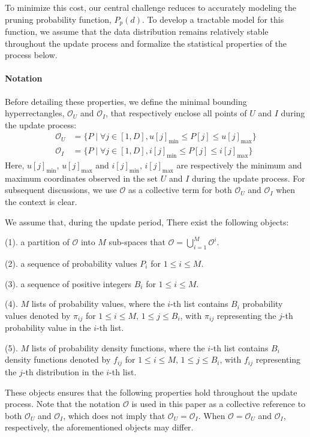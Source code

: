 To minimize this cost, our central challenge reduces to accurately modeling the pruning probability function, $P_p(d)$. To develop a tractable model for this function, we assume that the data distribution remains relatively stable throughout the update process and formalize the statistical properties of the process below.

\paragraph{Notation}
Before detailing these properties, we define the minimal bounding hyperrectangles, $\mathcal{O}_U$ and $\mathcal{O}_I$, that respectively enclose all points of $U$ and $I$ during the update process:
\begin{align}
    \mathcal{O}_U &= \{P \mid \forall j\in[1,D], u[j]_{\min} \le P[j] \le u[j]_{\max}\} \\
    \mathcal{O}_I &= \{P \mid \forall j\in[1,D], i[j]_{\min} \le P[j] \le i[j]_{\max}\}
\end{align}
Here, $u[j]_{\min}$, $u[j]_{\max}$ and $i[j]_{\min}$, $i[j]_{\max}$ are respectively the minimum and maximum coordinates observed in the set $U$ and $I$ during the update process. For subsequent discussions, we use $\mathcal{O}$ as a collective term for both $\mathcal{O}_U$ and $\mathcal{O}_I$ when the context is clear.

We assume that, during the update period, There exist the following objects:

\noindent (1). a partition of $\mathcal{O}$ into $M$ sub-spaces that $\mathcal{O} = \bigcup_{i=1}^{M}\mathcal{O}^i$.

\noindent (2). a sequence of probability values $P_i$ for $1 \leq i \leq M$.

\noindent (3). a sequence of positive integers $B_i$ for $1 \leq i \leq M$.

\noindent (4). $M$ lists of probability values, where the $i$-th list contains $B_i$ probability values denoted by $\pi_{ij}$ for $1 \leq i \leq M,\, 1 \leq j \leq B_i$, with $\pi_{ij}$ representing the $j$-th probability value in the $i$-th list.

\noindent (5). $M$ lists of probability density functions, where the $i$-th list contains $B_i$ density functions denoted by $f_{ij}$ for $1 \leq i \leq M,\, 1 \leq j \leq B_i$, with $f_{ij}$ representing the $j$-th distribution in the $i$-th list.

 These objects ensures that the following properties hold throughout the update process. Note that the notation $\mathcal{O}$ is used in this paper as a collective reference to both $\mathcal{O}_U$ and $\mathcal{O}_I$, which does not imply that $\mathcal{O}_U = \mathcal{O}_I$. When $\mathcal{O} = \mathcal{O}_U$ and $\mathcal{O}_I$, respectively, the aforementioned objects may differ.


